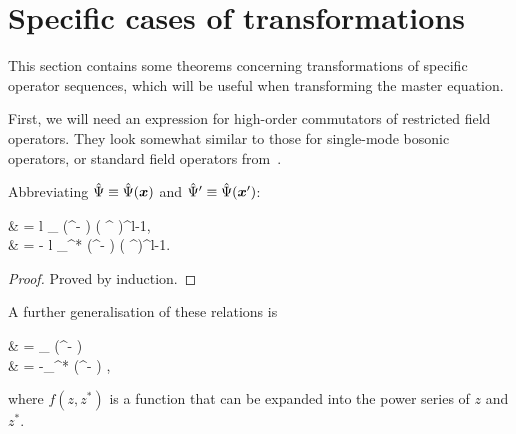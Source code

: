 \section{Specific cases of transformations}

This section contains some theorems concerning transformations of specific operator sequences, which will be useful when transforming the master equation.

First, we will need an expression for high-order commutators of restricted field operators.
They look somewhat similar to those for single-mode bosonic operators, or standard field operators from~\cite{Louisell1990}.

\begin{lemma}
	Abbreviating $\hat{\Psi} \equiv \hat{\Psi}(\boldsymbol{x})$ and $\hat{\Psi}^\prime \equiv \hat{\Psi}(\boldsymbol{x}^\prime)$:
	\begin{eqn*}
		& = l \delta_{\restbasis} (\xvec^\prime - \xvec) ( \Psiop^{\prime\dagger} )^{l-1}, \\
		& = - l \delta_{\restbasis}^* (\xvec^\prime - \xvec) ( \Psiop^\prime )^{l-1}.
	\end{eqn*}
\end{lemma}
\begin{proof}
Proved by induction.
\end{proof}

A further generalisation of these relations is

\begin{lemma}
\label{lmm:func-operators:functional-commutators}
	\begin{eqn*}
		& = \delta_{\restbasis} (\xvec^\prime - \xvec) \frac{\partial f}{\partial \Psiop^{\prime\dagger}} \\
		& = -\delta_{\restbasis}^* (\xvec^\prime - \xvec) \frac{\partial f}{\partial \Psiop^\prime},
	\end{eqn*}
	where $f(z, z^*)$ is a function that can be expanded into the power series of $z$ and $z^*$.
\end{lemma}


